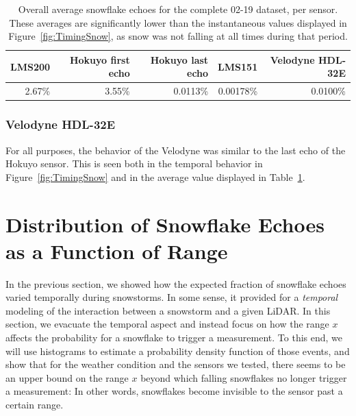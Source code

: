 \begin{table}
    \centering
    \begin{tabular}{@{}rrrrr@{}}
        \toprule
        \textbf{LMS200} & \textbf{Hokuyo first echo}     & \textbf{Hokuyo last echo}    & \textbf{LMS151} & \textbf{Velodyne HDL-32E} \\
        \hline
        2.67\%          &           3.55\%    &       0.0113\%     &   0.00178\%     &  0.0100\%  \\
        \bottomrule
    \end{tabular}
    \caption[Overall average snowflake echoes for the complete 02-19 dataset, per sensor.]{Overall average snowflake echoes for the complete 02-19 dataset, per sensor. These averages are significantly lower than the instantaneous values displayed in Figure~\ref{fig:TimingSnow}, as snow was not falling at all times during that period.}
    \label{tab:avgRates}
\end{table}

\subsubsection{Velodyne HDL-32E}
For all purposes, the behavior of the Velodyne was similar to the last echo of the Hokuyo sensor. This is seen both in the temporal behavior in Figure~\ref{fig:TimingSnow} and in the average value displayed in Table~\ref{tab:avgRates}.

\section{Distribution of Snowflake Echoes as a Function of Range}
\label{sec:chap_lidar_histo}

In the previous section, we showed how the expected fraction of snowflake echoes varied temporally during snowstorms. In some sense, it provided for a \emph{temporal} modeling of the interaction between a snowstorm and a given LiDAR. In this section, we evacuate the temporal aspect and instead focus on how the range $x$ affects the probability for a snowflake to trigger a measurement. To this end, we will use histograms to estimate a probability density function of those events, and show that for the weather condition and the sensors we tested, there seems to be an upper bound on the range $x$ beyond which falling snowflakes no longer trigger a measurement: In other words, snowflakes become invisible to the sensor past a certain range.

